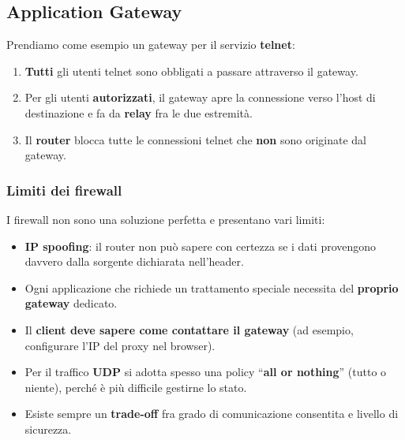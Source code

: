 \subsection{Application Gateway}

Prendiamo come esempio un gateway per il servizio \textbf{telnet}:
\begin{enumerate}
    \item \textbf{Tutti} gli utenti telnet sono obbligati a passare attraverso il gateway.
    \item Per gli utenti \textbf{autorizzati}, il gateway apre la connessione verso l'host di destinazione e fa da \textbf{relay} fra le due estremità.
    \item Il \textbf{router} blocca tutte le connessioni telnet che \textbf{non} sono originate dal gateway.
\end{enumerate}

\subsubsection{Limiti dei firewall}
I firewall non sono una soluzione perfetta e presentano vari limiti:
\begin{itemize}
    \item \textbf{IP spoofing}: il router non può sapere con certezza se i dati provengono davvero dalla sorgente dichiarata nell'header.
    \item Ogni applicazione che richiede un trattamento speciale necessita del \textbf{proprio gateway} dedicato.
    \item Il \textbf{client deve sapere come contattare il gateway} (ad esempio, configurare l'IP del proxy nel browser).
    \item Per il traffico \textbf{UDP} si adotta spesso una policy ``\textbf{all or nothing}'' (tutto o niente), perché è più difficile gestirne lo stato.
    \item Esiste sempre un \textbf{trade-off} fra grado di comunicazione consentita e livello di sicurezza.
\end{itemize}


